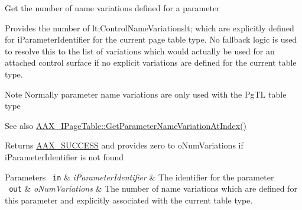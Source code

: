 Get the number of name variations defined for a parameter

Provides the number of {\ttfamily lt;Control\+Name\+Variationslt;} which are explicitly defined for {\ttfamily i\+Parameter\+Identifier} for the current page table type. No fallback logic is used to resolve this to the list of variations which would actually be used for an attached control surface if no explicit variations are defined for the current table type.

\begin{DoxyNote}{Note}
Normally parameter name variations are only used with the {\ttfamily \textquotesingle{}Pg\+TL\textquotesingle{}} table type
\end{DoxyNote}

\begin{DoxyItemize}
\item \begin{DoxySeeAlso}{See also}
\mbox{\hyperlink{a01849_adffe5a5f2ad548bd4c704508d816d568}{A\+A\+X\+\_\+\+I\+Page\+Table\+::\+Get\+Parameter\+Name\+Variation\+At\+Index()}}
\end{DoxySeeAlso}
\begin{DoxyReturn}{Returns}
\mbox{\hyperlink{a00494_a5f8c7439f3a706c4f8315a9609811937aeddbd1bb67e3a66e6af54a4b4a7a57b3}{A\+A\+X\+\_\+\+S\+U\+C\+C\+E\+SS}} and provides zero to {\ttfamily o\+Num\+Variations} if {\ttfamily i\+Parameter\+Identifier} is not found
\end{DoxyReturn}

\begin{DoxyParams}[1]{Parameters}
\mbox{\texttt{ in}}  & {\em i\+Parameter\+Identifier} & The identifier for the parameter \\
\hline
\mbox{\texttt{ out}}  & {\em o\+Num\+Variations} & The number of name variations which are defined for this parameter and explicitly associated with the current table type. \\
\hline
\end{DoxyParams}

\end{DoxyItemize}\mbox{\label{a01729_ab866525f8d8902ed8782dc01087d71ce}} 
